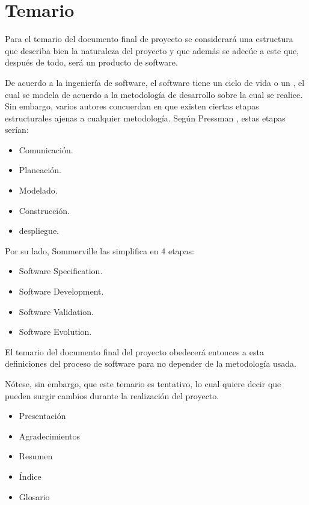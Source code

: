 \section{Temario}

Para el temario del documento final de proyecto se considerará una estructura que describa bien la naturaleza del proyecto y que además se adecúe a este que, después de todo, será un producto de software.

De acuerdo a la ingeniería de software, el software tiene un ciclo de vida o un , el cual se modela de acuerdo a la metodología de desarrollo sobre la cual se realice. Sin embargo, varios autores concuerdan en que existen ciertas etapas estructurales ajenas a cualquier metodología. Según Pressman \cite[13]{pressmanSoftwareEngineeringPractitioner2010}, estas etapas serían:

\begin{itemize}
    \item Comunicación.
    \item Planeación.
    \item Modelado.
    \item Construcción.
    \item despliegue.
\end{itemize}

Por su lado, Sommerville las simplifica en 4 etapas:

\begin{itemize}
    \item Software Specification.
    \item Software Development.
    \item Software Validation.
    \item Software Evolution.
\end{itemize}

El temario del documento final del proyecto obedecerá entonces a esta definiciones del proceso de software para no depender de la metodología usada.

Nótese, sin embargo, que este temario es tentativo, lo cual quiere decir que pueden surgir cambios durante la realización del proyecto.

\begin{itemize}
    \item Presentación
    \item Agradecimientos
    \item Resumen
    \item Índice
    \item Glosario
\end{itemize}

